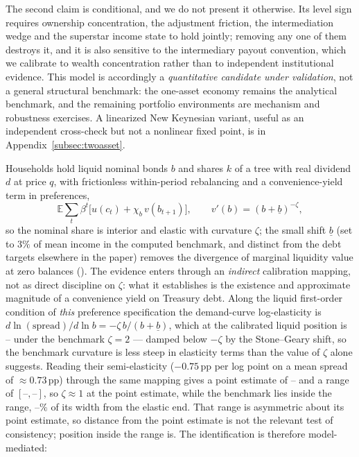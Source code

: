 \documentclass[12pt]{article}
\providecommand{\pendingnum}{\textit{--}}
\providecommand{\KvjElModel}{\pendingnum}\providecommand{\KvjElPoint}{\pendingnum}
\providecommand{\KvjElLo}{\pendingnum}\providecommand{\KvjElHi}{\pendingnum}
\providecommand{\KvjElPct}{\pendingnum}
\newcommand{\E}{\mathbb{E}}
\begin{document}
\noindent The second claim is conditional, and we do not present it
otherwise. Its level sign requires ownership concentration, the adjustment
friction, the intermediation wedge and the superstar income state to hold
jointly; removing any one of them destroys it, and it is also sensitive to
the intermediary payout convention, which we calibrate to wealth
concentration rather than to independent institutional evidence. This model
is accordingly a \emph{quantitative candidate under validation}, not a
general structural benchmark: the one-asset economy remains the analytical
benchmark, and the remaining portfolio environments are mechanism and
robustness exercises. A linearized New Keynesian variant, useful as an
independent cross-check but not a nonlinear fixed point, is in
Appendix~\ref{subsec:twoasset}.

Households hold liquid nominal bonds $b$ and shares $k$ of a tree with real
dividend $d$ at price $q$, with frictionless within-period rebalancing and a
convenience-yield term in preferences,
\[
\E \sum_t \beta^t \Big[ u(c_t) + \chi_b\, v(b_{t+1}) \Big],
\qquad v'(b) = (b + \underline{b})^{-\zeta},
\]
so the nominal share is interior and elastic with curvature $\zeta$; the
small shift $\underline{b}$ (set to $3\%$ of mean income in the computed
benchmark, and distinct from the debt targets elsewhere in the paper)
removes the divergence of marginal liquidity value at zero balances
(\citealp{krishnamurthy2012}). The \citeauthor{krishnamurthy2012} evidence
enters through an \emph{indirect} calibration mapping, not as direct
discipline on $\zeta$: what it establishes is the existence and approximate
magnitude of a convenience yield on Treasury debt. Along the liquid
first-order condition of \emph{this} preference specification the
demand-curve log-elasticity is
$d\ln(\text{spread})/d\ln b = -\zeta\, b/(b+\underline{b})$, which at the
calibrated liquid position is $\KvjElModel$ under the benchmark $\zeta = 2$ ---
damped below $-\zeta$ by the Stone--Geary shift, so the benchmark curvature is
less steep in elasticity terms than the value of $\zeta$ alone suggests.
Reading their semi-elasticity ($-0.75$\,pp per log point on a mean spread of
$\approx 0.73$\,pp) through the same mapping gives a point estimate of
$\KvjElPoint$ and a range of $[\KvjElLo, \KvjElHi]$, so $\zeta \approx 1$ at
the point estimate, while the benchmark lies inside the range, $\KvjElPct\%$
of its width from the elastic end. That range is asymmetric about its point
estimate, so distance from the point estimate is not the relevant test of
consistency; position inside the range is. The identification is therefore model-mediated:
\end{document}
